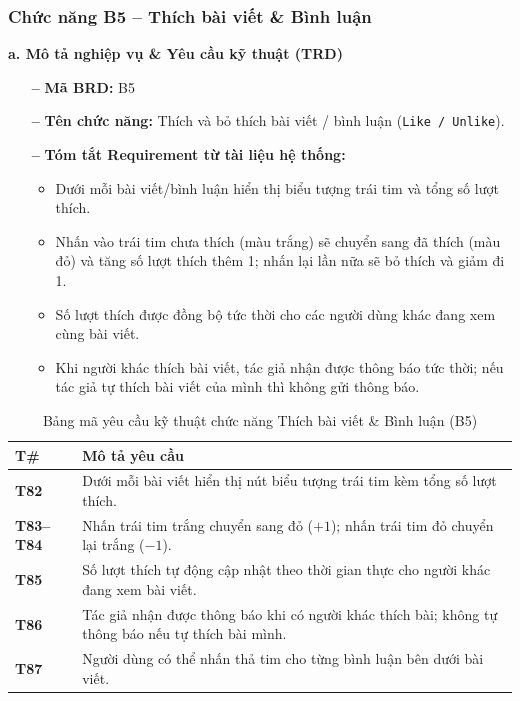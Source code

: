 \documentclass[11pt,a4paper]{article}
\begin{document}
\subsubsection{Chức năng B5 -- Thích bài viết \& Bình luận}

\noindent\textbf{a. Mô tả nghiệp vụ \& Yêu cầu kỹ thuật (TRD)}
\begin{itemize}[leftmargin=1.2cm, noitemsep]
    \item[\textbf{--}] \textbf{Mã BRD:} B5
    \item[\textbf{--}] \textbf{Tên chức năng:} Thích và bỏ thích bài viết / bình luận (\texttt{Like / Unlike}).
    \item[\textbf{--}] \textbf{Tóm tắt Requirement từ tài liệu hệ thống:}
    \begin{itemize}[leftmargin=0.8cm, label=$\bullet$, noitemsep]
        \item Dưới mỗi bài viết/bình luận hiển thị biểu tượng trái tim và tổng số lượt thích.
        \item Nhấn vào trái tim chưa thích (màu trắng) sẽ chuyển sang đã thích (màu đỏ) và tăng số lượt thích thêm 1; nhấn lại lần nữa sẽ bỏ thích và giảm đi 1.
        \item Số lượt thích được đồng bộ tức thời cho các người dùng khác đang xem cùng bài viết.
        \item Khi người khác thích bài viết, tác giả nhận được thông báo tức thời; nếu tác giả tự thích bài viết của mình thì không gửi thông báo.
    \end{itemize}
\end{itemize}

\begin{table}[H]
\centering
\small
\begin{tabularx}{\textwidth}{|C{1.8cm}|X|}
\hline
{}
\textbf{T\#} & \textbf{Mô tả yêu cầu} \tabularnewline
\hline
\textbf{T82} & Dưới mỗi bài viết hiển thị nút biểu tượng trái tim kèm tổng số lượt thích. \\ \hline
\textbf{T83--T84} & Nhấn trái tim trắng chuyển sang đỏ ($+1$); nhấn trái tim đỏ chuyển lại trắng ($-1$). \\ \hline
\textbf{T85} & Số lượt thích tự động cập nhật theo thời gian thực cho người khác đang xem bài viết. \\ \hline
\textbf{T86} & Tác giả nhận được thông báo khi có người khác thích bài; không tự thông báo nếu tự thích bài mình. \\ \hline
\textbf{T87} & Người dùng có thể nhấn thả tim cho từng bình luận bên dưới bài viết. \\ \hline
\end{tabularx}
\caption{Bảng mã yêu cầu kỹ thuật chức năng Thích bài viết \& Bình luận (B5)}
\end{table}
\end{document}
